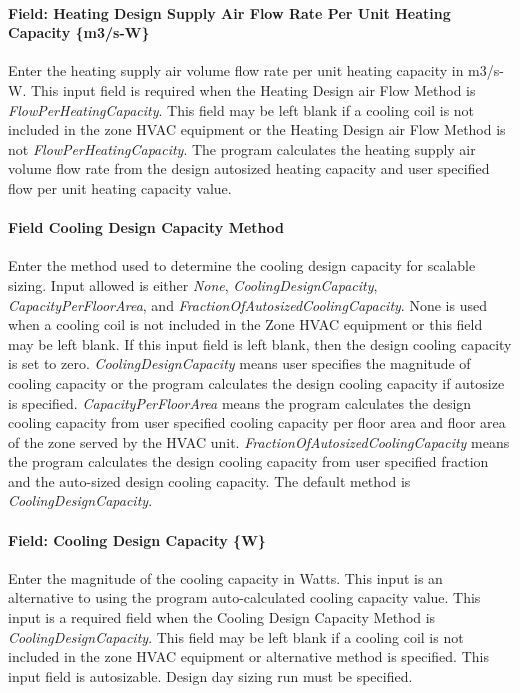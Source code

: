 \paragraph{Field: Heating Design Supply Air Flow Rate Per Unit Heating Capacity \{m3/s-W\}}\label{field-heating-design-supply-air-flow-rate-per-unit-heating-capacity-m3s-w}

Enter the heating supply air volume flow rate per unit heating capacity in m3/s-W. This input field is required when the Heating Design air Flow Method is \emph{FlowPerHeatingCapacity}. This field may be left blank if a cooling coil is not included in the zone HVAC equipment or the Heating Design air Flow Method is not \emph{FlowPerHeatingCapacity}. The program calculates the heating supply air volume flow rate from the design autosized heating capacity and user specified flow per unit heating capacity value.

\paragraph{Field Cooling Design Capacity Method}\label{field-cooling-design-capacity-method}

Enter the method used to determine the cooling design capacity for scalable sizing. Input allowed is either \emph{None}, \emph{CoolingDesignCapacity}, \emph{CapacityPerFloorArea}, and \emph{FractionOfAutosizedCoolingCapacity}. None is used when a cooling coil is not included in the Zone HVAC equipment or this field may be left blank. If this input field is left blank, then the design cooling capacity is set to zero. \emph{CoolingDesignCapacity} means user specifies the magnitude of cooling capacity or the program calculates the design cooling capacity if autosize is specified. \emph{CapacityPerFloorArea} means the program calculates the design cooling capacity from user specified cooling capacity per floor area and floor area of the zone served by the HVAC unit. \emph{FractionOfAutosizedCoolingCapacity} means the program calculates the design cooling capacity from user specified fraction and the auto-sized design cooling capacity. The default method is \emph{CoolingDesignCapacity}.

\paragraph{Field: Cooling Design Capacity \{W\}}\label{field-cooling-design-capacity-w}

Enter the magnitude of the cooling capacity in Watts. This input is an alternative to using the program auto-calculated cooling capacity value. This input is a required field when the Cooling Design Capacity Method is \emph{CoolingDesignCapacity}. This field may be left blank if a cooling coil is not included in the zone HVAC equipment or alternative method is specified. This input field is autosizable. Design day sizing run must be specified.

